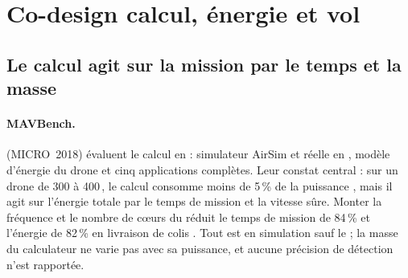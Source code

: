 \section{Co-design calcul, énergie et vol}
\label{sec:codesign}

\subsection{Le calcul agit sur la mission par le temps et la masse}

\paragraph{MAVBench.} \citet{arxiv-1905.06388-mavbench-micro-aerial-vehicle-benchmarking}
(MICRO~2018) évaluent le calcul en  : simulateur AirSim et  réelle
en \emph{}, modèle d'énergie du drone et cinq applications complètes.
Leur constat central : sur un drone de 300 à 400\,, le calcul consomme moins de 5\,\% de la
puissance , mais il agit sur l'énergie totale par le temps de mission et la vitesse
sûre. Monter la fréquence et le nombre de cœurs du  réduit le temps de mission de 84\,\%
et l'énergie de 82\,\% en livraison de colis . Tout est en simulation sauf le
 ; la masse du calculateur ne varie pas avec sa puissance, et aucune précision de
détection n'est rapportée.

